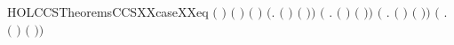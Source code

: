 \newcommand{\HOLCCSTheoremsBVXXSUBSETXXrules}{\UseVerbatim{HOLCCSTheoremsBVXXSUBSETXXrules}}
\begin{SaveVerbatim}{HOLCCSTheoremsCCSXXcaseXXeq}
\HOLTokenTurnstile{} \ensuremath{(}          \HOLSymConst{\ensuremath{=}} \ensuremath{)} \HOLSymConst{\HOLTokenEquiv{}}
   \ensuremath{(} \HOLSymConst{\ensuremath{=}} \ensuremath{)} \HOLSymConst{\HOLTokenConj{}} \ensuremath{(} \HOLSymConst{\ensuremath{=}} \ensuremath{)} \HOLSymConst{\HOLTokenDisj{}} \ensuremath{(}\HOLSymConst{\HOLTokenExists{}}. \ensuremath{(} \HOLSymConst{\ensuremath{=}}  \ensuremath{)} \HOLSymConst{\HOLTokenConj{}} \ensuremath{(}  \HOLSymConst{\ensuremath{=}} \ensuremath{)}\ensuremath{)} \HOLSymConst{\HOLTokenDisj{}}
   \ensuremath{(}\HOLSymConst{\HOLTokenExists{}} . \ensuremath{(} \HOLSymConst{\ensuremath{=}} \HOLSymConst{\ensuremath{\ldotp}}\ensuremath{)} \HOLSymConst{\HOLTokenConj{}} \ensuremath{(}   \HOLSymConst{\ensuremath{=}} \ensuremath{)}\ensuremath{)} \HOLSymConst{\HOLTokenDisj{}}
   \ensuremath{(}\HOLSymConst{\HOLTokenExists{}} . \ensuremath{(} \HOLSymConst{\ensuremath{=}}  \HOLSymConst{\ensuremath{+}} \ensuremath{)} \HOLSymConst{\HOLTokenConj{}} \ensuremath{(}   \HOLSymConst{\ensuremath{=}} \ensuremath{)}\ensuremath{)} \HOLSymConst{\HOLTokenDisj{}}
   \ensuremath{(}\HOLSymConst{\HOLTokenExists{}} . \ensuremath{(} \HOLSymConst{\ensuremath{=}}  \HOLSymConst{\ensuremath{\mid}} \ensuremath{)} \HOLSymConst{\HOLTokenConj{}} \ensuremath{(}   \HOLSymConst{\ensuremath{=}} \ensuremath{)}\ensuremath{)} \HOLSymConst{\HOLTokenDisj{}}

\end{SaveVerbatim}
